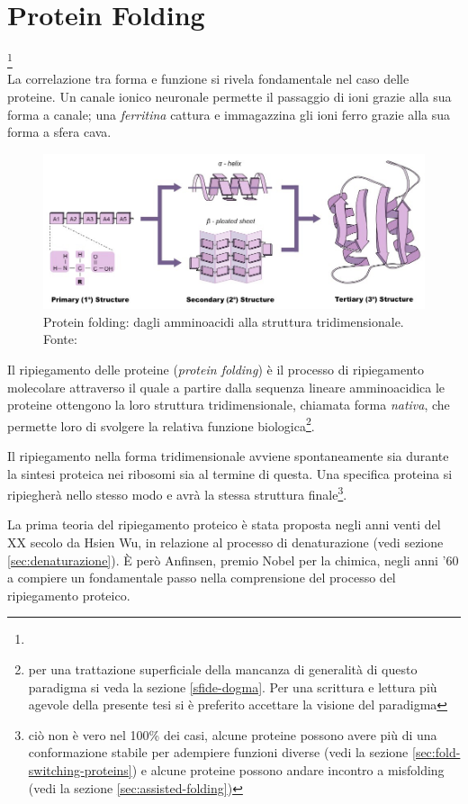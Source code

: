 \chapter{Protein Folding}
{
\footnote{}\\

La correlazione tra forma e funzione si rivela fondamentale nel caso delle proteine. Un canale ionico neuronale permette il passaggio di ioni grazie alla sua forma a canale; una \textit{ferritina} cattura e immagazzina gli ioni ferro grazie alla sua forma a sfera cava. 

\begin{figure}[htp]
	\centering
	\includegraphics[scale=0.5]{images/protein-folding_med.jpeg}
	\caption{Protein folding: dagli amminoacidi alla struttura tridimensionale. Fonte: \cite{proteinStrucBioNinja}}
	\label{fig:protein-folding-bioninja}
\end{figure}

\par Il ripiegamento delle proteine (\textit{protein folding}) è il processo di ripiegamento molecolare attraverso il quale a partire dalla sequenza lineare amminoacidica le proteine ottengono la loro struttura tridimensionale, chiamata forma \textit{nativa}, che permette loro di svolgere la relativa funzione biologica\footnote{per una trattazione superficiale della mancanza di generalità di questo paradigma si veda la sezione \ref{sfide-dogma}. Per una scrittura e lettura più agevole della presente tesi si è preferito accettare la visione del paradigma}. 

\par Il ripiegamento nella forma tridimensionale avviene spontaneamente sia durante la sintesi proteica nei ribosomi sia al termine di questa. Una specifica proteina si ripiegherà nello stesso modo e avrà la stessa struttura finale\footnote{ciò non è vero nel 100\% dei casi, alcune proteine possono avere più di una conformazione stabile per adempiere funzioni diverse (vedi la sezione \ref{sec:fold-switching-proteins}) e alcune proteine possono andare incontro a misfolding (vedi la sezione \ref{sec:assisted-folding})}.

\par La prima teoria del ripiegamento proteico è stata proposta negli anni venti del XX secolo da Hsien Wu\supercite{wu1931studies}, in relazione al processo di denaturazione (vedi sezione \ref{sec:denaturazione}). È però Anfinsen, premio Nobel per la chimica, negli anni '60 a compiere un fondamentale passo nella comprensione del processo del ripiegamento proteico\supercite{anfinsen1972formation}. 

}
